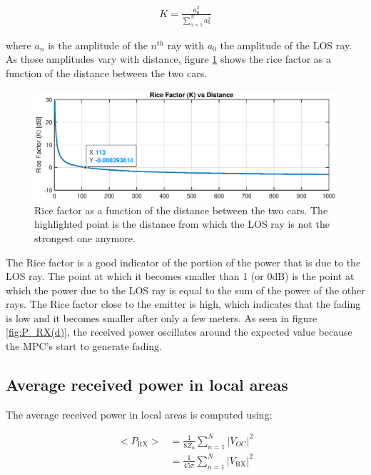 \documentclass[10pt,a4paper]{ULBreport}
\begin{document}
\begin{align*}
    K = \frac{a_0^2}{\sum_{n=1}^{N}a_n^2}
\end{align*}

where $a_n$ is the amplitude of the $n^{th}$ ray with $a_0$ the amplitude of the LOS ray. As those amplitudes vary with distance, figure \ref{fig:K(d)} shows the rice factor as a function of the distance between the two cars. 

\begin{figure}[H]
    \centering
    \includegraphics[width=1\textwidth]{3_4.eps}
    \caption{Rice factor as a function of the distance between the two cars. The highlighted point is the distance from which the LOS ray is not the strongest one anymore.}
    \label{fig:K(d)}
\end{figure}

The Rice factor is a good indicator of the portion of the power that is due to the LOS ray. The point at which it becomes smaller than 1 (or 0dB) is the point at which the power due to the LOS ray is equal to the sum of the power of the other rays. The Rice factor close to the emitter is high, which indicates that the fading is low and it becomes smaller after only a few meters. As seen in figure \ref{fig:P_RX(d)}, the received power oscillates around the expected value because the MPC's start to generate fading.\\

\subsection{Average received power in local areas}
The average received power in local areas is computed using:

\begin{align*}
    <P_{\text{RX}}> &= \frac{1}{8 Z_a} \sum_{n=1}^{N} \left| V_{OC} \right|^2\\
    &= \frac{1}{45\pi} \sum_{n=1}^{N} \left| V_{\text{RX}} \right|^2\\
\end{align*}
\end{document}
